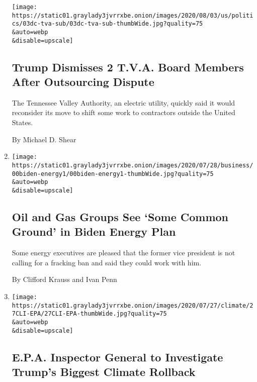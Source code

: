 \begin{enumerate}
  \texttt{[image: https://static01.graylady3jvrrxbe.onion/images/2020/08/03/us/politics/03dc-tva-sub/03dc-tva-sub-thumbWide.jpg?quality=75\\\&auto=webp\\\&disable=upscale]}

  \hypertarget{trump-dismisses-2-tva-board-members-after-outsourcing-dispute}{%
  \subsection{Trump Dismisses 2 T.V.A. Board Members After Outsourcing
  Dispute}\label{trump-dismisses-2-tva-board-members-after-outsourcing-dispute}}

  The Tennessee Valley Authority, an electric utility, quickly said it
  would reconsider its move to shift some work to contractors outside
  the United States.

  By Michael D. Shear
\item
  \href{/2020/07/28/business/energy-environment/joe-biden-oil-gas-energy.html}{}

  \texttt{[image: https://static01.graylady3jvrrxbe.onion/images/2020/07/28/business/00biden-energy1/00biden-energy1-thumbWide.jpg?quality=75\\\&auto=webp\\\&disable=upscale]}

  \hypertarget{oil-and-gas-groups-see-some-common-ground-in-biden-energy-plan}{%
  \subsection{Oil and Gas Groups See `Some Common Ground' in Biden
  Energy
  Plan}\label{oil-and-gas-groups-see-some-common-ground-in-biden-energy-plan}}

  Some energy executives are pleased that the former vice president is
  not calling for a fracking ban and said they could work with him.

  By Clifford Krauss and Ivan Penn
\item
  \href{/2020/07/27/climate/trump-fuel-efficiency-rule.html}{}

  \texttt{[image: https://static01.graylady3jvrrxbe.onion/images/2020/07/27/climate/27CLI-EPA/27CLI-EPA-thumbWide.jpg?quality=75\\\&auto=webp\\\&disable=upscale]}

  \hypertarget{epa-inspector-general-to-investigate-trumps-biggest-climate-rollback}{%
  \subsection{E.P.A. Inspector General to Investigate Trump's Biggest
  Climate
  Rollback}\label{epa-inspector-general-to-investigate-trumps-biggest-climate-rollback}}


\end{enumerate}
